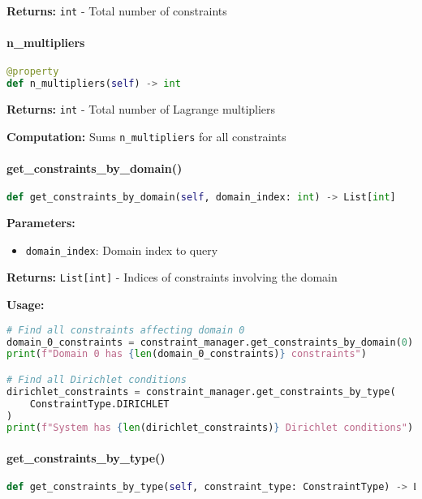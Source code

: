 \textbf{Returns:} \texttt{int} - Total number of constraints

\paragraph{n\_multipliers}\leavevmode
\begin{lstlisting}[language=Python, caption=Number of Multipliers Property]
@property
def n_multipliers(self) -> int
\end{lstlisting}

\textbf{Returns:} \texttt{int} - Total number of Lagrange multipliers

\textbf{Computation:} Sums \texttt{n\_multipliers} for all constraints

\paragraph{get\_constraints\_by\_domain()}\leavevmode
\begin{lstlisting}[language=Python, caption=Get Constraints by Domain Method]
def get_constraints_by_domain(self, domain_index: int) -> List[int]
\end{lstlisting}

\textbf{Parameters:}
\begin{itemize}
    \item \texttt{domain\_index}: Domain index to query
\end{itemize}

\textbf{Returns:} \texttt{List[int]} - Indices of constraints involving the domain

\textbf{Usage:}
\begin{lstlisting}[language=Python, caption=Query Constraints Usage]
# Find all constraints affecting domain 0
domain_0_constraints = constraint_manager.get_constraints_by_domain(0)
print(f"Domain 0 has {len(domain_0_constraints)} constraints")

# Find all Dirichlet conditions
dirichlet_constraints = constraint_manager.get_constraints_by_type(
    ConstraintType.DIRICHLET
)
print(f"System has {len(dirichlet_constraints)} Dirichlet conditions")
\end{lstlisting}

\paragraph{get\_constraints\_by\_type()}\leavevmode
\begin{lstlisting}[language=Python, caption=Get Constraints by Type Method]
def get_constraints_by_type(self, constraint_type: ConstraintType) -> List[int]
\end{lstlisting}

